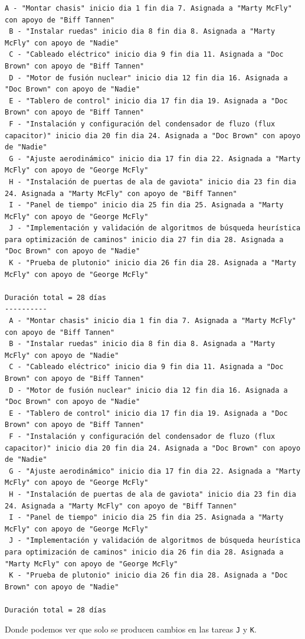 \documentclass[11pt]{article}
\begin{document}
\begin{enumerate}[label=\alph*)]
\begin{lstlisting}[basicstyle=\ttfamily\fontsize{6.8}{9}\selectfont]
 A - "Montar chasis" inicio dia 1 fin dia 7. Asignada a "Marty McFly" con apoyo de "Biff Tannen"
 B - "Instalar ruedas" inicio dia 8 fin dia 8. Asignada a "Marty McFly" con apoyo de "Nadie"
 C - "Cableado eléctrico" inicio dia 9 fin dia 11. Asignada a "Doc Brown" con apoyo de "Biff Tannen"
 D - "Motor de fusión nuclear" inicio dia 12 fin dia 16. Asignada a "Doc Brown" con apoyo de "Nadie"
 E - "Tablero de control" inicio dia 17 fin dia 19. Asignada a "Doc Brown" con apoyo de "Biff Tannen"
 F - "Instalación y configuración del condensador de fluzo (flux capacitor)" inicio dia 20 fin dia 24. Asignada a "Doc Brown" con apoyo de "Nadie"
 G - "Ajuste aerodinámico" inicio dia 17 fin dia 22. Asignada a "Marty McFly" con apoyo de "George McFly"
 H - "Instalación de puertas de ala de gaviota" inicio dia 23 fin dia 24. Asignada a "Marty McFly" con apoyo de "Biff Tannen"
 I - "Panel de tiempo" inicio dia 25 fin dia 25. Asignada a "Marty McFly" con apoyo de "George McFly"
 J - "Implementación y validación de algoritmos de búsqueda heurística para optimización de caminos" inicio dia 27 fin dia 28. Asignada a "Doc Brown" con apoyo de "Nadie"
 K - "Prueba de plutonio" inicio dia 26 fin dia 28. Asignada a "Marty McFly" con apoyo de "George McFly"

Duración total = 28 días
----------
 A - "Montar chasis" inicio dia 1 fin dia 7. Asignada a "Marty McFly" con apoyo de "Biff Tannen"
 B - "Instalar ruedas" inicio dia 8 fin dia 8. Asignada a "Marty McFly" con apoyo de "Nadie"
 C - "Cableado eléctrico" inicio dia 9 fin dia 11. Asignada a "Doc Brown" con apoyo de "Biff Tannen"
 D - "Motor de fusión nuclear" inicio dia 12 fin dia 16. Asignada a "Doc Brown" con apoyo de "Nadie"
 E - "Tablero de control" inicio dia 17 fin dia 19. Asignada a "Doc Brown" con apoyo de "Biff Tannen"
 F - "Instalación y configuración del condensador de fluzo (flux capacitor)" inicio dia 20 fin dia 24. Asignada a "Doc Brown" con apoyo de "Nadie"
 G - "Ajuste aerodinámico" inicio dia 17 fin dia 22. Asignada a "Marty McFly" con apoyo de "George McFly"
 H - "Instalación de puertas de ala de gaviota" inicio dia 23 fin dia 24. Asignada a "Marty McFly" con apoyo de "Biff Tannen"
 I - "Panel de tiempo" inicio dia 25 fin dia 25. Asignada a "Marty McFly" con apoyo de "George McFly"
 J - "Implementación y validación de algoritmos de búsqueda heurística para optimización de caminos" inicio dia 26 fin dia 28. Asignada a "Marty McFly" con apoyo de "George McFly"
 K - "Prueba de plutonio" inicio dia 26 fin dia 28. Asignada a "Doc Brown" con apoyo de "Nadie"

Duración total = 28 días
\end{lstlisting}

Donde podemos ver que solo se producen cambios en las tareas \verb|J| y \verb|K|.

\end{enumerate}
\end{document}
